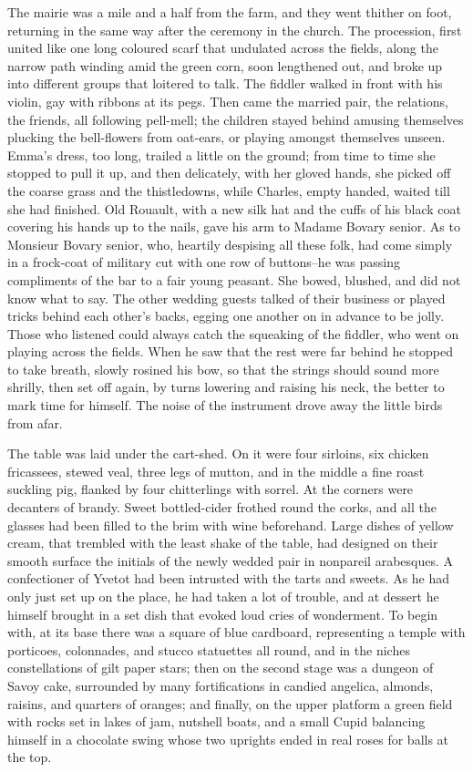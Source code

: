 \documentclass[11pt,twocolumn]{ltugboat}
\begin{document}
The mairie was a mile and a half from the farm, and they went thither
on foot, returning in the same way after the ceremony in the church.
The procession, first united like one long coloured scarf that undulated
across the fields, along the narrow path winding amid the green corn,
soon lengthened out, and broke up into different groups that loitered to
talk. The fiddler walked in front with his violin, gay with ribbons at
its pegs. Then came the married pair, the relations, the friends, all
following pell-mell; the children stayed behind amusing themselves
plucking the bell-flowers from oat-ears, or playing amongst themselves
unseen. Emma's dress, too long, trailed a little on the ground; from
time to time she stopped to pull it up, and then delicately, with her
gloved hands, she picked off the coarse grass and the thistledowns,
while Charles, empty handed, waited till she had finished. Old Rouault,
with a new silk hat and the cuffs of his black coat covering his hands
up to the nails, gave his arm to Madame Bovary senior. As to Monsieur
Bovary senior, who, heartily despising all these folk, had come simply
in a frock-coat of military cut with one row of buttons--he was passing
compliments of the bar to a fair young peasant. She bowed, blushed,
and did not know what to say. The other wedding guests talked of their
business or played tricks behind each other's backs, egging one another
on in advance to be jolly. Those who listened could always catch the
squeaking of the fiddler, who went on playing across the fields. When
he saw that the rest were far behind he stopped to take breath, slowly
rosined his bow, so that the strings should sound more shrilly, then set
off again, by turns lowering and raising his neck, the better to mark
time for himself. The noise of the instrument drove away the little
birds from afar.

The table was laid under the cart-shed. On it were four sirloins, six
chicken fricassees, stewed veal, three legs of mutton, and in the middle
a fine roast suckling pig, flanked by four chitterlings with sorrel. At
the corners were decanters of brandy. Sweet bottled-cider frothed round
the corks, and all the glasses had been filled to the brim with wine
beforehand. Large dishes of yellow cream, that trembled with the least
shake of the table, had designed on their smooth surface the initials of
the newly wedded pair in nonpareil arabesques. A confectioner of Yvetot
had been intrusted with the tarts and sweets. As he had only just set up
on the place, he had taken a lot of trouble, and at dessert he himself
brought in a set dish that evoked loud cries of wonderment. To begin
with, at its base there was a square of blue cardboard, representing a
temple with porticoes, colonnades, and stucco statuettes all round, and
in the niches constellations of gilt paper stars; then on the second
stage was a dungeon of Savoy cake, surrounded by many fortifications
in candied angelica, almonds, raisins, and quarters of oranges; and
finally, on the upper platform a green field with rocks set in lakes of
jam, nutshell boats, and a small Cupid balancing himself in a chocolate
swing whose two uprights ended in real roses for balls at the top.
\end{document}

